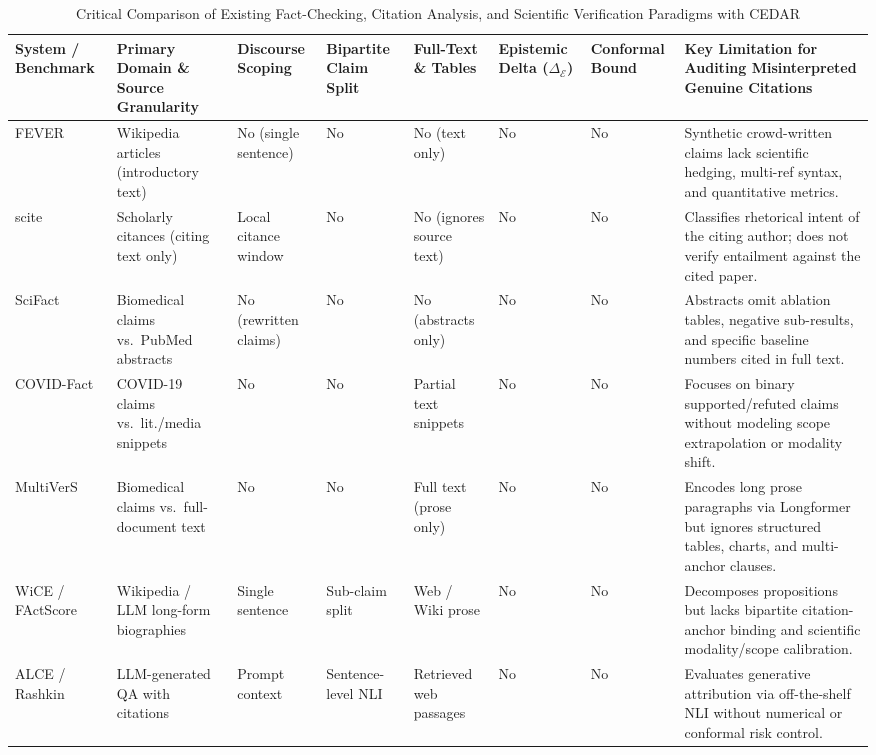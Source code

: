 \documentclass[sigconf]{acmart}
\begin{document}
\begin{table}[t]
\centering
\footnotesize
\caption{Critical Comparison of Existing Fact-Checking, Citation Analysis, and Scientific Verification Paradigms with CEDAR}
\label{tab:literature_comparison}
\renewcommand{\arraystretch}{1.14}
\begin{tabularx}{\textwidth}{L{2.6cm} L{2.2cm} C{1.4cm} C{1.5cm} C{1.5cm} C{1.5cm} C{1.4cm} Y}
\toprule
\textbf{System / Benchmark} & \textbf{Primary Domain \& Source Granularity} & \textbf{Discourse Scoping} & \textbf{Bipartite Claim Split} & \textbf{Full-Text \& Tables} & \textbf{Epistemic Delta ($\Delta_{\mathcal{E}}$)} & \textbf{Conformal Bound} & \textbf{Key Limitation for Auditing Misinterpreted Genuine Citations} \\
\midrule
FEVER \cite{thorne2018fever} & Wikipedia articles (introductory text) & No (single sentence) & No & No (text only) & No & No & Synthetic crowd-written claims lack scientific hedging, multi-ref syntax, and quantitative metrics. \\
scite \cite{nicholson2021scite} & Scholarly citances (citing text only) & Local citance window & No & No (ignores source text) & No & No & Classifies rhetorical intent of the citing author; does not verify entailment against the cited paper. \\
SciFact \cite{wadden2020fact} & Biomedical claims vs.\ PubMed abstracts & No (rewritten claims) & No & No (abstracts only) & No & No & Abstracts omit ablation tables, negative sub-results, and specific baseline numbers cited in full text. \\
COVID-Fact \cite{saakyan2021covidfact} & COVID-19 claims vs.\ lit./media snippets & No & No & Partial text snippets & No & No & Focuses on binary supported/refuted claims without modeling scope extrapolation or modality shift. \\
MultiVerS \cite{wadden2022multivers} & Biomedical claims vs.\ full-document text & No & No & Full text (prose only) & No & No & Encodes long prose paragraphs via Longformer but ignores structured tables, charts, and multi-anchor clauses. \\
WiCE \cite{kamoi2023wice} / FActScore \cite{min2023factscore} & Wikipedia / LLM long-form biographies & Single sentence & Sub-claim split & Web / Wiki prose & No & No & Decomposes propositions but lacks bipartite citation-anchor binding and scientific modality/scope calibration. \\
ALCE \cite{gao2023enabling} / Rashkin \cite{rashkin2023measuring} & LLM-generated QA with citations & Prompt context & Sentence-level NLI & Retrieved web passages & No & No & Evaluates generative attribution via off-the-shelf NLI without numerical or conformal risk control. \\

\end{tabularx}
\end{table}
\end{document}
